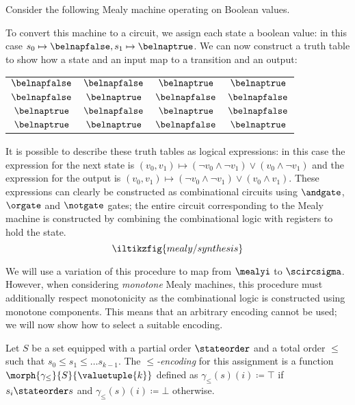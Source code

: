 \begin{example}
    Consider the following Mealy machine operating on Boolean values.
    \begin{center}
        
    \end{center}
    \vspace{-\belowdisplayskip}
    To convert this machine to a circuit, we assign each state a boolean value:
    in this case \(s_0 \mapsto \belnapfalse, s_1 \mapsto \belnaptrue\).
    We can now construct a truth table to show how a state and an input map to
    a transition and an output:
    \begin{center}
        \begin{tabular}{cc|cc}
            \(\belnapfalse\) & \(\belnapfalse\) & \(\belnaptrue\)  & \(\belnaptrue\)  \\
            \(\belnapfalse\) & \(\belnaptrue\)  & \(\belnapfalse\) & \(\belnapfalse\) \\
            \(\belnaptrue\)  & \(\belnapfalse\) & \(\belnaptrue\)  & \(\belnapfalse\) \\
            \(\belnaptrue\)  & \(\belnaptrue\)  & \(\belnapfalse\) & \(\belnaptrue\)  \\
        \end{tabular}
    \end{center}
    It is possible to describe these truth tables as logical expressions: in
    this case the expression for the next state is \(
    (v_0, v_1)
    \mapsto
    (\neg v_0 \land \neg v_1) \lor (v_0 \land \neg v_1)
    \) and the expression for the output is \(
    (v_0, v_1)
    \mapsto
    (\neg v_0 \land \neg v_1) \lor (v_0 \land v_1)
    \).
    These expressions can clearly be constructed as combinational circuits using
    \(\andgate\), \(\orgate\) and \(\notgate\) gates; the entire circuit
    corresponding to the Mealy machine is constructed by combining the
    combinational logic with registers to hold the state.
    \[\iltikzfig{mealy/synthesis}\]
\end{example}

We will use a variation of this procedure to map from \(\mealyi\) to
\(\scircsigma\).
However, when considering \emph{monotone} Mealy machines, this procedure must
additionally respect monotonicity as the combinational logic is constructed
using monotone components.
This means that an arbitrary encoding cannot be used; we will now show how to
select a suitable encoding.

\begin{definition}[Encoding]\label{def:encoding}
    Let \(S\) be a set equipped with a partial order \(\stateorder\) and a total
    order \(\leq\) such that \(s_0 \leq s_1 \leq \dots s_{k-1}\).
    The \emph{\(\leq\)-encoding} for this assignment is a function
    \(\morph{\gamma_\leq}{S}{\valuetuple{k}}\) defined as
    \(\gamma_\leq(s)(i) \coloneqq \top\) if \(s_i \stateorder s\) and
    \(\gamma_\leq(s)(i) \coloneqq \bot\) otherwise.
\end{definition}

